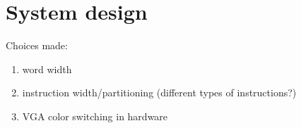 \section{System design}

Choices made:
\begin{enumerate}
\item word width
\item instruction width/partitioning (different types of instructions?)
\item \ac{VGA} color switching in hardware
\end{enumerate}

